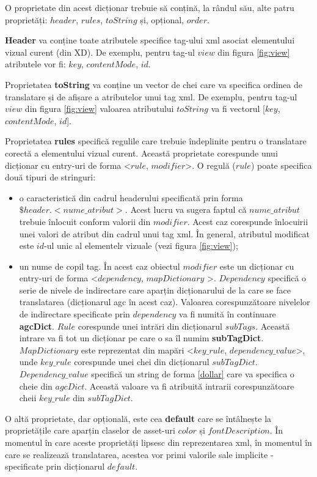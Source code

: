O proprietate din acest dicționar trebuie să conțină, la rândul său, alte patru proprietăți: $header$, $rules$, $toString$ și, opțional, $order$. 

\textbf{Header} va conține toate atributele specifice tag-ului xml asociat elementului vizual curent (din XD). De exemplu, pentru tag-ul $view$ din figura \ref{fig:view} atributele vor fi: $key$, $contentMode$, $id$. 

Proprietatea \textbf{toString} va conține un vector de chei care va specifica ordinea de translatare și de afișare a atributelor unui tag xml. De exemplu, pentru tag-ul $view$ din figura \ref{fig:view}  valoarea atributului $toString$ va fi vectorul [$key$, $contentMode$, $id$].

Proprietatea \textbf{rules} specifică regulile care trebuie îndeplinite pentru o translatare corectă a elementului vizual curent. Această proprietate corespunde unui dicționar cu entry-uri de forma <$rule$, $modifier$>.
O regulă ($rule$) poate specifica două tipuri de stringuri:

\begin{itemize}  
\item o caracteristică din cadrul headerului specificată prin forma $\$header.<nume\_atribut>$. Acest lucru va sugera faptul că $nume\_atribut$ trebuie înlocuit conform valorii  din $modifier$. Acest caz corespunde înlocuirii unei valori de atribut din cadrul unui tag xml. În general, atributul modificat este $id$-ul unic al elementelr vizuale (vezi figura \ref{fig:view});
\item un nume de copil tag. În acest caz obiectul $modifier$ este un dicționar cu entry-uri de forma <$dependency$, $mapDictionary$ >. $Dependency$ specifică o serie de nivele de indirectare care aparțin dicționarului de la care se face translatarea (dicționarul agc în acest caz). Valoarea corespunzătoare nivelelor de indirectare specificate prin $dependency$ va fi numită în continuare \textbf{agcDict}. $Rule$ corespunde unei intrări din dicționarul $subTags$. Această intrare va fi tot un dicționar pe care o sa îl numim \textbf{subTagDict}. $MapDictionary$ este reprezentat din mapări <$key\_rule$, $dependency\_value$>, unde $key\_rule$ corespunde unei chei din dicționarul $subTagDict$. $Dependency\_value$ specifică un string de forma \ref{dollar} care va specifica o cheie din $agcDict$. Această valoare va fi atribuită intrarii corespunzătoare cheii $key\_rule$ din $subTagDict$. 
\end{itemize}
 
 O altă proprietate, dar opțională, este cea \textbf{default} care se întâlnește la proprietățile care aparțin claselor de asset-uri $color$ și $fontDescription$. În momentul în care aceste proprietăți lipsesc din reprezentarea xml, în momentul în care se realizează translatarea, acestea vor primi valorile sale implicite - specificate prin dicționarul $default$.

